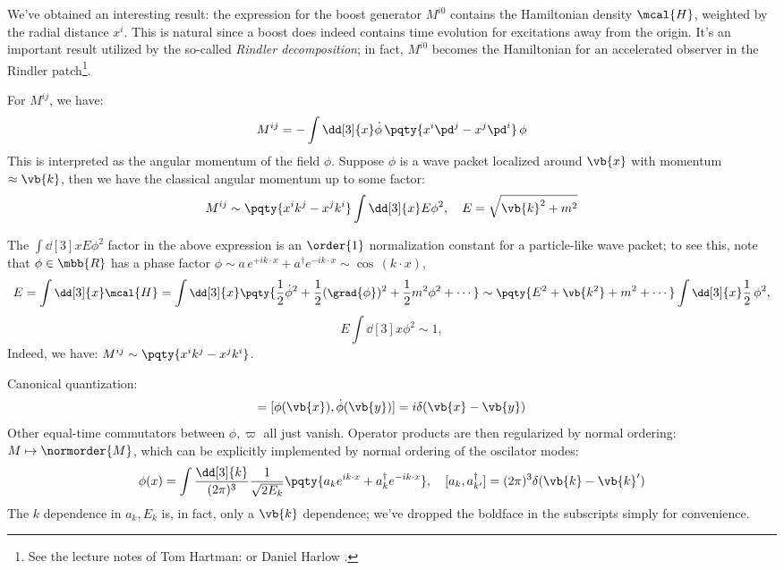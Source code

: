 \documentclass[a4paper,10pt]{article}
\begin{document}
\begin{itemize}
	We've obtained an interesting result: the expression for the boost generator $M^{i0}$ contains the Hamiltonian density $\mcal{H}$, weighted by the radial distance $x^i$. This is natural since a boost does indeed contains time evolution for excitations away from the origin. It's an important result utilized by the so-called \textit{Rindler decomposition}; in fact, $M^{i0}$ becomes the Hamiltonian for an accelerated observer in the Rindler patch\footnote{
		See the lecture notes of Tom Hartman:  or Daniel Harlow . 
	}. 
	
	For $M^{ij}$, we have:
	\begin{equation}
		M^{ij}
		= - \int \dd[3]{x}
			\dot{\phi}\,\pqty{
				x^i \pd^j
				- x^j \pd^i
			}\,\phi
	\end{equation}
	This is interpreted as the angular momentum of the field $\phi$. Suppose $\phi$ is a wave packet localized around $\vb{x}$ with momentum $\approx \vb{k}$, then we have the classical angular momentum up to some factor:
	\begin{equation}
		M^{ij}
		\sim \pqty{
				x^i k^j
				- x^j k^i
			} \int \dd[3]{x}
				E \phi^2,
	\quad
		E = \sqrt{\vb{k}^2 + m^2}
	\end{equation}
	
	The $
		\int \dd[3]{x} E \phi^2
	$ factor in the above expression is an $\order{1}$ normalization constant for a particle-like wave packet; to see this, note that $\phi\in\mbb{R}$ has a phase factor $
		\phi
		\sim a\,e^{+ik\cdot x} + a^\dagger e^{-ik\cdot x}
		\sim \cos\,(k\cdot x)
	$,
	\begin{gather}
	\small
		E = \int \dd[3]{x} \mcal{H}
		= \int \dd[3]{x} \pqty{
				\frac{1}{2} \dot{\phi}^2
				+ \frac{1}{2} (\grad{\phi})^2
				+ \frac{1}{2} m^2 \phi^2
				+ \cdots
			}
		\sim \pqty{E^2 + \vb{k^2} + m^2 + \cdots}
			\int \dd[3]{x} \frac{1}{2}\,\phi^2,
	\end{gather}
	\vspace{-.7\baselineskip}
	\begin{equation}
		E\int \dd[3]{x} \phi^2 \sim 1,
	\end{equation}
	Indeed, we have: $
		M^{ij}
		\sim \pqty{
				x^i k^j
				- x^j k^i
			}
	$. 
	
	Canonical quantization:
	\begin{gather}
		[\phi(\vb{x}),\varpi(\vb{y})]
		= [\phi(\vb{x}),\dot{\phi}(\vb{y})]
		= i\delta(\vb{x} - \vb{y})
	\end{gather}
	Other equal-time commutators between $\phi,\varpi$ all just vanish. Operator products are then regularized by normal ordering: $M\mapsto \normorder{M}$, which can be explicitly implemented by normal ordering of the oscilator modes:
	\begin{equation}
		\phi(x)
		= \int \frac{\dd[3]{k}}{(2\pi)^3}
			\frac{1}{\sqrt{2E_k}}
			\pqty{
				a_{k} e^{ik\cdot x}
				+ a^\dagger_{k} e^{-ik\cdot x}
			},
	\quad
		[a_{k}, a^\dagger_{k'}]
		= (2\pi)^3 \delta(\vb{k} - \vb{k}')
	\end{equation}
	The $k$ dependence in $a_k, E_k$ is, in fact, only a $\vb{k}$ dependence; we've dropped the boldface in the subscripts simply for convenience.
	

\end{itemize}
\end{document}
